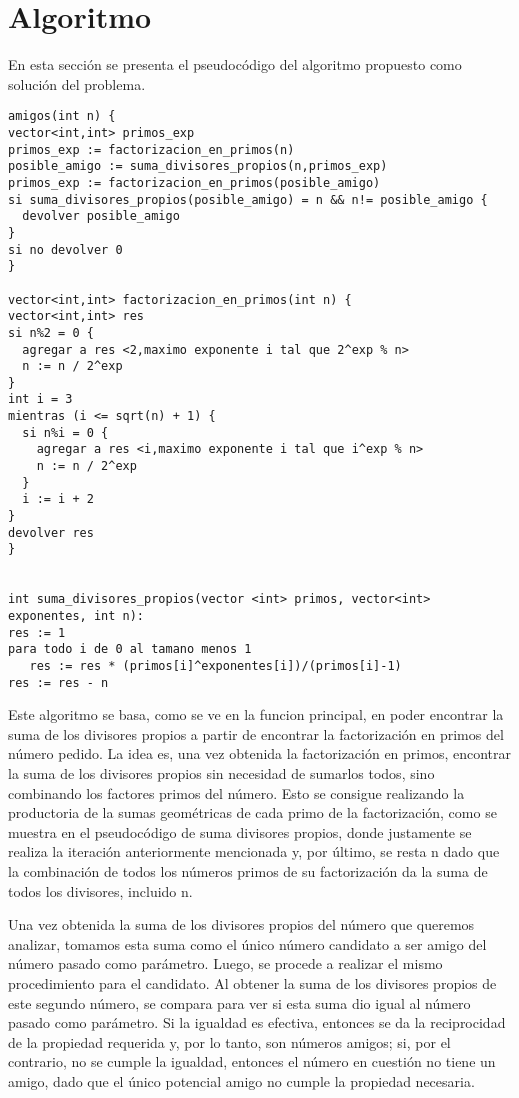 \documentclass[a4paper, 12pt] {article}
\begin{document}
\section*{Algoritmo}
En esta secci\'on se presenta el pseudoc\'odigo del algoritmo propuesto como soluci\'on del problema.
\begin{verbatim}
amigos(int n) {
vector<int,int> primos_exp
primos_exp := factorizacion_en_primos(n)
posible_amigo := suma_divisores_propios(n,primos_exp)
primos_exp := factorizacion_en_primos(posible_amigo)
si suma_divisores_propios(posible_amigo) = n && n!= posible_amigo {
  devolver posible_amigo
}
si no devolver 0
}

vector<int,int> factorizacion_en_primos(int n) {
vector<int,int> res
si n%2 = 0 {
  agregar a res <2,maximo exponente i tal que 2^exp % n>
  n := n / 2^exp
}
int i = 3 
mientras (i <= sqrt(n) + 1) {
  si n%i = 0 {
    agregar a res <i,maximo exponente i tal que i^exp % n>
    n := n / 2^exp
  }
  i := i + 2
}
devolver res
}


int suma_divisores_propios(vector <int> primos, vector<int> exponentes, int n):
res := 1
para todo i de 0 al tamano menos 1
   res := res * (primos[i]^exponentes[i])/(primos[i]-1)
res := res - n

\end{verbatim}

Este algoritmo se basa, como se ve en la funcion principal, en poder encontrar la suma de los divisores propios a partir de encontrar la factorizaci\'on en primos del n\'umero pedido. La idea es, una vez obtenida la factorizaci\'on en primos, encontrar la suma de los divisores propios sin necesidad de sumarlos todos, sino combinando los factores primos del n\'umero. Esto se consigue realizando la productoria de la sumas geom\'etricas de cada primo de la factorizaci\'on, como se muestra en el pseudoc\'odigo de suma divisores propios, donde justamente se realiza la iteraci\'on anteriormente mencionada y, por \'ultimo, se resta n dado que la combinaci\'on de todos los n\'umeros primos de su factorizaci\'on da la suma de todos los divisores, incluido n.

Una vez obtenida la suma de los divisores propios del n\'umero que queremos analizar, tomamos esta suma como el \'unico n\'umero candidato a ser amigo del n\'umero pasado como par\'ametro. Luego, se procede a realizar el mismo procedimiento para el candidato. Al obtener la suma de los divisores propios de este segundo n\'umero, se compara para ver si esta suma dio igual al n\'umero pasado como par\'ametro. Si la igualdad es efectiva, entonces se da la reciprocidad de la propiedad requerida y, por lo tanto, son n\'umeros amigos; si, por el contrario, no se cumple la igualdad, entonces el n\'umero en cuesti\'on no tiene un amigo, dado que el \'unico potencial amigo no cumple la propiedad necesaria.
\end{document}
